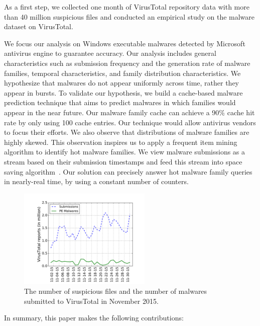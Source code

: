 As a first step, we collected one month of VirusTotal repository data with more than 40 million suspicious files
and conducted an empirical study on the malware dataset on VirusTotal. 

We focus our analysis on Windows executable malwares detected by Microsoft
antivirus engine to guarantee accuracy. 
Our analysis includes general characteristics such as submission frequency and the generation rate of malware families, 
temporal characteristics, and family distribution characteristics. 
We hypothesize that malwares do not appear uniformly across time, rather they appear in bursts. 
To validate our hypothesis, we build a cache-based malware prediction technique that aims to predict malwares in which families would appear in the near future. 
Our malware family cache can achieve a 90\% cache hit rate by only using 100 cache entries.
Our technique would allow antivirus vendors to focus their efforts. 
We also observe that distributions of malware families are highly skewed. 
This observation inspires us to apply a frequent item mining algorithm to 
identify hot malware families. 
We view malware submissions as a stream based on their submission timestamps and 
feed this stream into space saving algorithm~\cite{space-saving}. 
Our solution can precisely answer hot malware family queries in nearly-real time, by using a constant number of counters.  


\begin{figure}[t!]
\begin{center}
\includegraphics[width=2.5in]{figure/nov}
\caption{The number of suspicious files and the number of malwares submitted to VirusTotal in November 2015. }
\label{fig:subnum}
\end{center}
\end{figure}

In summary, this paper makes the following contributions:

